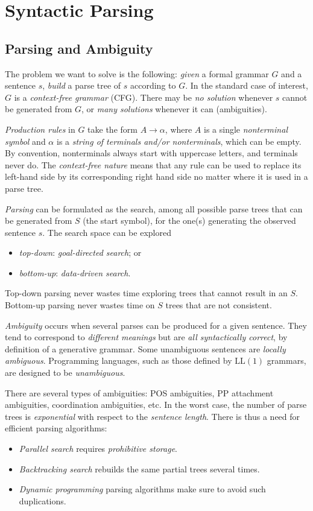 \section{Syntactic Parsing}
\subsection{Parsing and Ambiguity}
The problem we want to solve is the following: \emph{given} a formal grammar \(G\) and a sentence \(s\), \emph{build} a parse tree of \(s\) according to \(G\).
In the standard case of interest, \(G\) is a \emph{context-free grammar} (CFG).
There may be \emph{no solution} whenever \(s\) cannot be generated from \(G\), or \emph{many solutions} whenever it can (ambiguities).

\emph{Production rules} in \(G\) take the form \(A \to \alpha\), where \(A\) is a single \emph{nonterminal symbol} and \(\alpha\) is a \emph{string of terminals and/or nonterminals}, which can be empty.
By convention, nonterminals always start with uppercase letters, and terminals never do.
The \emph{context-free nature} means that any rule can be used to replace its left-hand side by its corresponding right hand side no matter where it is used in a parse tree.

\emph{Parsing} can be formulated as the search, among all possible parse trees that can be generated from \(S\) (the start symbol), for the one(s) generating the observed sentence \(s\).
The search space can be explored
\begin{itemize}
	\item \emph{top-down}: \emph{goal-directed search}; or
	\item \emph{bottom-up}: \emph{data-driven search}.
\end{itemize}
Top-down parsing never wastes time exploring trees that cannot result in an \(S\).
Bottom-up parsing never wastes time on \(S\) trees that are not consistent.

\emph{Ambiguity} occurs when several parses can be produced for a given sentence.
They tend to correspond to \emph{different meanings} but are \emph{all syntactically correct}, by definition of a generative grammar.
Some unambiguous sentences are \emph{locally ambiguous}.
Programming languages, such as those defined by \(\mathrm{LL}(1)\) grammars, are designed to be \emph{unambiguous}.

There are several types of ambiguities: POS ambiguities, PP attachment ambiguities, coordination ambiguities, etc.
In the worst case, the number of parse trees is \emph{exponential} with respect to the \emph{sentence length}.
There is thus a need for efficient parsing algorithms:
\begin{itemize}
	\item \emph{Parallel search} requires \emph{prohibitive storage}.
	\item \emph{Backtracking search} rebuilds the same partial trees several times.
	\item \emph{Dynamic programming} parsing algorithms make sure to avoid such duplications. 
\end{itemize}

